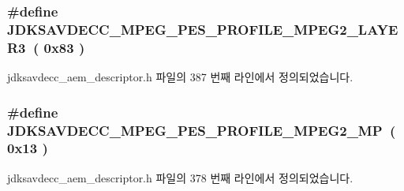 \subsubsection[{\texorpdfstring{J\+D\+K\+S\+A\+V\+D\+E\+C\+C\+\_\+\+M\+P\+E\+G\+\_\+\+P\+E\+S\+\_\+\+P\+R\+O\+F\+I\+L\+E\+\_\+\+M\+P\+E\+G2\+\_\+\+L\+A\+Y\+E\+R3}{JDKSAVDECC_MPEG_PES_PROFILE_MPEG2_LAYER3}}]{\setlength{\rightskip}{0pt plus 5cm}\#define J\+D\+K\+S\+A\+V\+D\+E\+C\+C\+\_\+\+M\+P\+E\+G\+\_\+\+P\+E\+S\+\_\+\+P\+R\+O\+F\+I\+L\+E\+\_\+\+M\+P\+E\+G2\+\_\+\+L\+A\+Y\+E\+R3~( 0x83 )}\hypertarget{group__mpeg__pes__profile_ga535a43ed59c35214d394322c0480a043}{}\label{group__mpeg__pes__profile_ga535a43ed59c35214d394322c0480a043}


jdksavdecc\+\_\+aem\+\_\+descriptor.\+h 파일의 387 번째 라인에서 정의되었습니다.

\subsubsection[{\texorpdfstring{J\+D\+K\+S\+A\+V\+D\+E\+C\+C\+\_\+\+M\+P\+E\+G\+\_\+\+P\+E\+S\+\_\+\+P\+R\+O\+F\+I\+L\+E\+\_\+\+M\+P\+E\+G2\+\_\+\+MP}{JDKSAVDECC_MPEG_PES_PROFILE_MPEG2_MP}}]{\setlength{\rightskip}{0pt plus 5cm}\#define J\+D\+K\+S\+A\+V\+D\+E\+C\+C\+\_\+\+M\+P\+E\+G\+\_\+\+P\+E\+S\+\_\+\+P\+R\+O\+F\+I\+L\+E\+\_\+\+M\+P\+E\+G2\+\_\+\+MP~( 0x13 )}\hypertarget{group__mpeg__pes__profile_ga8a28eaad8ffae26e9e2b964424f2bb51}{}\label{group__mpeg__pes__profile_ga8a28eaad8ffae26e9e2b964424f2bb51}


jdksavdecc\+\_\+aem\+\_\+descriptor.\+h 파일의 378 번째 라인에서 정의되었습니다.

